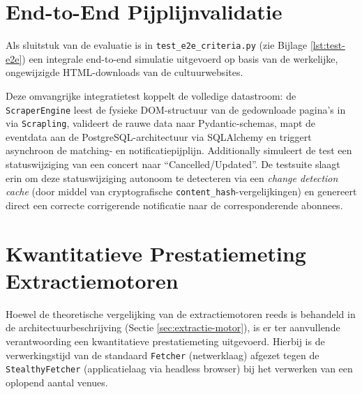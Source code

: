 \section{End-to-End Pijplijnvalidatie}
\label{sec:e2e-validatie}

Als sluitstuk van de evaluatie is in \texttt{test\_e2e\_criteria.py} 
(zie Bijlage \ref{lst:test-e2e}) een integrale end-to-end simulatie 
uitgevoerd op basis van de werkelijke, ongewijzigde HTML-downloads 
van de cultuurwebsites. 

Deze omvangrijke integratietest koppelt de volledige datastroom: 
de \texttt{ScraperEngine} leest de fysieke DOM-structuur van de 
gedownloade pagina's in via \texttt{Scrapling}, valideert de rauwe 
data naar Pydantic-schemas, mapt de eventdata aan de PostgreSQL-architectuur 
via SQLAlchemy en triggert asynchroon de matching- en notificatiepijplijn. 
Additionally simuleert de test een statuswijziging van een concert 
naar ``Cancelled/Updated''. De testsuite slaagt erin om deze 
statuswijziging autonoom te detecteren via een \textit{change detection cache} 
(door middel van cryptografische \texttt{content\_hash}-vergelijkingen) 
en genereert direct een correcte corrigerende notificatie naar 
de corresponderende abonnees.

\section{Kwantitatieve Prestatiemeting Extractiemotoren}
\label{sec:benchmark-fetchers}

Hoewel de theoretische vergelijking van de extractiemotoren reeds 
is behandeld in de architectuurbeschrijving (Sectie \ref{sec:extractie-motor}), 
is er ter aanvullende verantwoording een kwantitatieve prestatiemeting 
uitgevoerd. Hierbij is de verwerkingstijd van de standaard \texttt{Fetcher} 
(netwerklaag) afgezet tegen de \texttt{StealthyFetcher} (applicatielaag via 
headless browser) bij het verwerken van een oplopend aantal venues.

